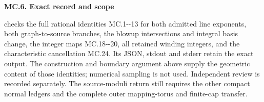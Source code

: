 \par

\medskip\noindent\textbf{MC.6. Exact record and scope}

\par\nobreak


checks the full rational identities MC.1-\/-13 for both
admitted line exponents, both graph-to-source branches,
the blowup intersections and integral basis change,
the integer maps MC.18-\/-20, all retained winding
integers, and the characteristic cancellation MC.24.
Its JSON, stdout and stderr retain the exact output.
The construction and boundary argument above supply
the geometric content of those identities; numerical
sampling is not used. Independent review is recorded
separately. The source-moduli return still requires
the other compact normal ledgers and the complete
outer mapping-torus and finite-cap transfer.

